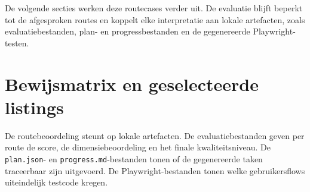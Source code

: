 De volgende secties werken deze routecases verder uit. De evaluatie blijft beperkt tot de afgesproken routes en koppelt elke interpretatie aan lokale artefacten, zoals evaluatiebestanden, plan- en progressbestanden en de gegenereerde Playwright-testen.

\section{Bewijsmatrix en geselecteerde listings}

De routebeoordeling steunt op lokale artefacten. De evaluatiebestanden geven per route de score, de dimensiebeoordeling en het finale kwaliteitsniveau. De \texttt{plan.json}- en \texttt{progress.md}-bestanden tonen of de gegenereerde taken traceerbaar zijn uitgevoerd. De Playwright-bestanden tonen welke gebruikersflows uiteindelijk testcode kregen.

